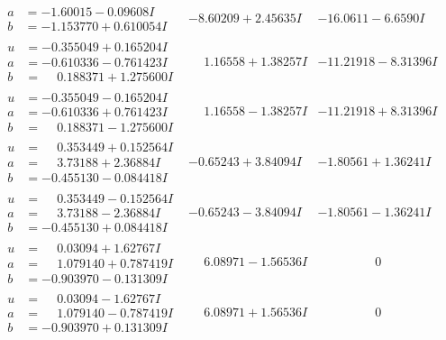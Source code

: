\documentclass[1p]{elsarticle_modified}
\theoremstyle{definition}
\begin{document}
$$\begin{array}{c|c|c}
\begin{aligned}
a &= -1.60015 - 0.09608 I \\
b &= -1.153770 + 0.610054 I\end{aligned}
 & -8.60209 + 2.45635 I & -16.0611 - 6.6590 I \\ \hline\begin{aligned}
u &= -0.355049 + 0.165204 I \\
a &= -0.610336 - 0.761423 I \\
b &= \phantom{-}0.188371 + 1.275600 I\end{aligned}
 & \phantom{-}1.16558 + 1.38257 I & -11.21918 - 8.31396 I \\ \hline\begin{aligned}
u &= -0.355049 - 0.165204 I \\
a &= -0.610336 + 0.761423 I \\
b &= \phantom{-}0.188371 - 1.275600 I\end{aligned}
 & \phantom{-}1.16558 - 1.38257 I & -11.21918 + 8.31396 I \\ \hline\begin{aligned}
u &= \phantom{-}0.353449 + 0.152564 I \\
a &= \phantom{-}3.73188 + 2.36884 I \\
b &= -0.455130 - 0.084418 I\end{aligned}
 & -0.65243 + 3.84094 I & -1.80561 + 1.36241 I \\ \hline\begin{aligned}
u &= \phantom{-}0.353449 - 0.152564 I \\
a &= \phantom{-}3.73188 - 2.36884 I \\
b &= -0.455130 + 0.084418 I\end{aligned}
 & -0.65243 - 3.84094 I & -1.80561 - 1.36241 I \\ \hline\begin{aligned}
u &= \phantom{-}0.03094 + 1.62767 I \\
a &= \phantom{-}1.079140 + 0.787419 I \\
b &= -0.903970 - 0.131309 I\end{aligned}
 & \phantom{-}6.08971 - 1.56536 I & \phantom{-0.000000 } 0 \\ \hline\begin{aligned}
u &= \phantom{-}0.03094 - 1.62767 I \\
a &= \phantom{-}1.079140 - 0.787419 I \\
b &= -0.903970 + 0.131309 I\end{aligned}
 & \phantom{-}6.08971 + 1.56536 I & \phantom{-0.000000 } 0 \\ \hline\begin{aligned}

\end{aligned}
\end{array}$$
\end{document}

